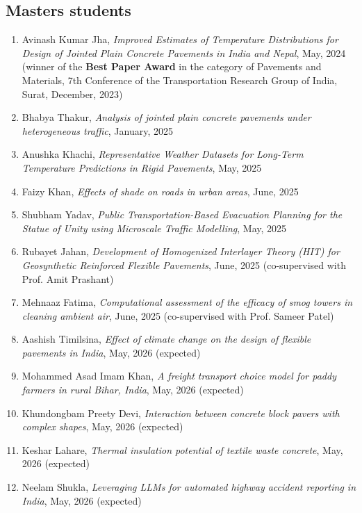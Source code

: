 \documentclass[12pt]{article}
\begin{document}
\subsection*{Masters students}
\begin{enumerate}
	\item Avinash Kumar Jha, \textit{Improved Estimates of Temperature Distributions for Design of Jointed Plain Concrete Pavements in India and Nepal}, May, 2024 (winner of the \textbf{Best Paper Award} in the category of Pavements and Materials, 7th Conference of the Transportation Research Group of India, Surat, December, 2023)
	\item Bhabya Thakur, \textit{Analysis of jointed plain concrete pavements under heterogeneous traffic}, January, 2025
	\item Anushka Khachi, \textit{Representative Weather Datasets for Long-Term Temperature Predictions in Rigid Pavements}, May, 2025
	\item Faizy Khan, \textit{Effects of shade on roads in urban areas}, June, 2025
	\item Shubham Yadav, \textit{Public Transportation-Based Evacuation Planning for the Statue of Unity using Microscale Traffic Modelling}, May, 2025
	\item Rubayet Jahan, \textit{Development of Homogenized Interlayer Theory (HIT) for Geosynthetic Reinforced Flexible Pavements}, June, 2025 (co-supervised with Prof. Amit Prashant)
	\item Mehnaaz Fatima, \textit{Computational assessment of the efficacy of smog towers in cleaning ambient air}, June, 2025 (co-supervised with Prof. Sameer Patel)
	\item Aashish Timilsina, \textit{Effect of climate change on the design of flexible pavements in India}, May, 2026 (expected)
	\item Mohammed Asad Imam Khan, \textit{A freight transport choice model for paddy farmers in rural Bihar, India}, May, 2026 (expected)
	\item Khundongbam Preety Devi, \textit{Interaction between concrete block pavers with complex shapes}, May, 2026 (expected)
	\item Keshar Lahare, \textit{Thermal insulation potential of textile waste concrete}, May, 2026 (expected)
	\item Neelam Shukla, \textit{Leveraging LLMs for automated highway accident reporting in India}, May, 2026 (expected)
\end{enumerate}

\hfill
\end{document}
